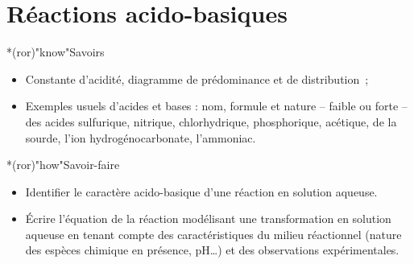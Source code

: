 \documentclass[../../main/main.tex]{subfiles}
\begin{document}
\setcounter{chapter}{3}


\chapter{R\'eactions acido-basiques}

\vspace*{\fill}

\begin{prgm}
	\begin{tcb}*(ror)"know"{Savoirs}
		\begin{itemize}
			\item Constante d'acidité, diagramme de prédominance et de distribution~;
			\item Exemples usuels d'acides et bases : nom, formule et nature --
			      faible ou forte -- des acides sulfurique, nitrique, chlorhydrique,
			      phosphorique, acétique, de la sourde, l'ion hydrogénocarbonate,
			      l'ammoniac.
		\end{itemize}
	\end{tcb}
	\begin{tcb}*(ror)"how"{Savoir-faire}
		\begin{itemize}
			\item Identifier le caractère acido-basique d'une réaction en solution
			      aqueuse.
			\item Écrire l'équation de la réaction modélisant une transformation en
			      solution aqueuse en tenant compte des caractéristiques du milieu
			      réactionnel (nature des espèces chimique en présence, pH…) et des
			      observations expérimentales.
		\end{itemize}
	\end{tcb}
\end{prgm}

\vspace*{\fill}
\minitoc
\vspace*{\fill}

\newpage
\end{document}
